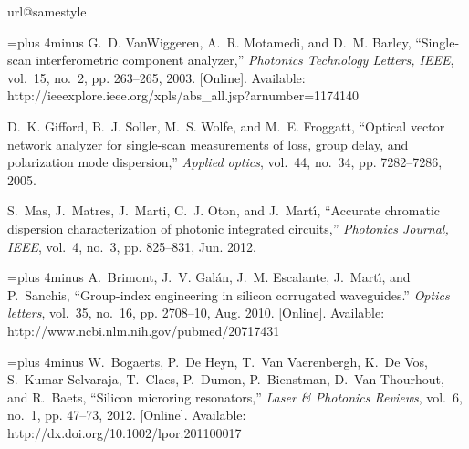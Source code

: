 \documentclass[journal]{IEEEtran}
\begin{document}
\begin{thebibliography}{10}
\providecommand{\url}[1]{#1}
\csname url@samestyle\endcsname
\providecommand{\newblock}{\relax}
\providecommand{\bibinfo}[2]{#2}
\providecommand{\BIBentrySTDinterwordspacing}{\spaceskip=0pt\relax}
\providecommand{\BIBentryALTinterwordstretchfactor}{4}
\providecommand{\BIBentryALTinterwordspacing}{\spaceskip=\fontdimen2\font plus
\BIBentryALTinterwordstretchfactor\fontdimen3\font minus
  \fontdimen4\font\relax}
\providecommand{\BIBforeignlanguage}[2]{{%
\expandafter\ifx\csname l@#1\endcsname\relax
\typeout{** WARNING: IEEEtran.bst: No hyphenation pattern has been}%
\typeout{** loaded for the language `#1'. Using the pattern for}%
\typeout{** the default language instead.}%
\else
\language=\csname l@#1\endcsname
\fi
#2}}
\providecommand{\BIBdecl}{\relax}
\BIBdecl

\BIBentryALTinterwordspacing
G.~D. VanWiggeren, A.~R. Motamedi, and D.~M. Barley, ``{Single-scan
  interferometric component analyzer},'' \emph{Photonics Technology Letters,
  IEEE}, vol.~15, no.~2, pp. 263--265, 2003. [Online]. Available:
  \url{http://ieeexplore.ieee.org/xpls/abs\_all.jsp?arnumber=1174140}
\BIBentrySTDinterwordspacing

D.~K. Gifford, B.~J. Soller, M.~S. Wolfe, and M.~E. Froggatt, ``{Optical vector
  network analyzer for single-scan measurements of loss, group delay, and
  polarization mode dispersion},'' \emph{Applied optics}, vol.~44, no.~34, pp.
  7282--7286, 2005.

S.~Mas, J.~Matres, J.~Marti, C.~J. Oton, and J.~Mart\'{\i}, ``{Accurate
  chromatic dispersion characterization of photonic integrated circuits},''
  \emph{Photonics Journal, IEEE}, vol.~4, no.~3, pp. 825--831, Jun. 2012.

\BIBentryALTinterwordspacing
A.~Brimont, J.~V. Gal\'{a}n, J.~M. Escalante, J.~Mart\'{\i}, and P.~Sanchis,
  ``{Group-index engineering in silicon corrugated waveguides.}'' \emph{Optics
  letters}, vol.~35, no.~16, pp. 2708--10, Aug. 2010. [Online]. Available:
  \url{http://www.ncbi.nlm.nih.gov/pubmed/20717431}
\BIBentrySTDinterwordspacing

\BIBentryALTinterwordspacing
W.~Bogaerts, P.~{De Heyn}, T.~{Van Vaerenbergh}, K.~{De Vos}, S.~{Kumar
  Selvaraja}, T.~Claes, P.~Dumon, P.~Bienstman, D.~{Van Thourhout}, and
  R.~Baets, ``{Silicon microring resonators},'' \emph{Laser \& Photonics
  Reviews}, vol.~6, no.~1, pp. 47--73, 2012. [Online]. Available:
  \url{http://dx.doi.org/10.1002/lpor.201100017}
\BIBentrySTDinterwordspacing


\end{thebibliography}
\end{document}
